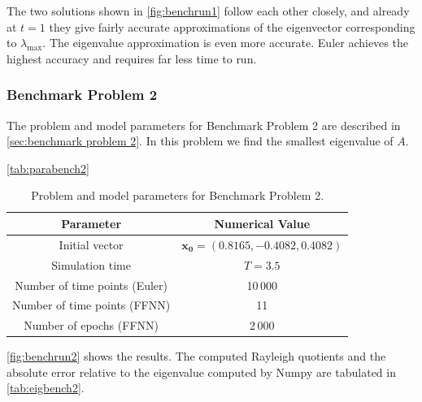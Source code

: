 The two solutions shown in \autoref{fig:benchrun1} follow each other closely, and already at $t=1$ they give fairly accurate approximations of the eigenvector corresponding to $\lambda_\mathrm{max}$. The eigenvalue approximation is even more accurate. Euler achieves the highest accuracy and requires far less time to run.

\subsubsection{Benchmark Problem 2}

The problem and model parameters for Benchmark Problem 2 are described in \autoref{sec:benchmark problem 2}. In this problem we find the smallest eigenvalue of $A$.

\autoref{tab:parabench2}

\begin{table}[H]
\caption{Problem and model parameters for Benchmark Problem 2.}
\centering
{}
\begin{tabular}{c|c}
\hline
\hline 
Parameter & Numerical Value
\\
\hline 
\hline 
Initial vector & $\bm{x_0}=(0.8165, -0.4082,  0.4082)$
\\
Simulation time & $T=3.5$
\\
Number of time points (Euler) & 10\,000
\\
Number of time points (FFNN) & 11
\\
Number of epochs (FFNN) & 2\,000
\\
\hline
\hline 
\end{tabular}
\label{tab:parabench2}
\end{table}

\autoref{fig:benchrun2} shows the results. The computed Rayleigh quotients and the absolute error relative to the eigenvalue computed by Numpy are tabulated in \autoref{tab:eigbench2}. 

